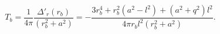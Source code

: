 \begin{equation}
T_{b}=\frac{1}{4\pi}\frac{\Delta
'_{r}(r_{b})}{(r_b^2+a^2)}=-\frac{3r_b^4+r_b^2(a^2-l^2)+(a^2+q^2)l^2}{4\pi
r_b l^2(r_b^2+a^2)}. \label{tem2}
\end{equation}

